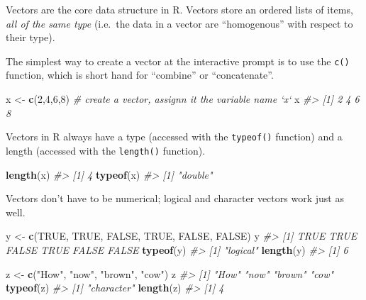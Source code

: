 \documentclass[]{book}
\newenvironment{Shaded}{\begin{snugshade}}{\end{snugshade}}
\newcommand{\CommentTok}[1]{\textcolor[rgb]{0.56,0.35,0.01}{\textit{#1}}}
\newcommand{\DecValTok}[1]{\textcolor[rgb]{0.00,0.00,0.81}{#1}}
\newcommand{\KeywordTok}[1]{\textcolor[rgb]{0.13,0.29,0.53}{\textbf{#1}}}
\newcommand{\NormalTok}[1]{#1}
\newcommand{\OtherTok}[1]{\textcolor[rgb]{0.56,0.35,0.01}{#1}}
\newcommand{\StringTok}[1]{\textcolor[rgb]{0.31,0.60,0.02}{#1}}
\theoremstyle{definition}
\theoremstyle{definition}
\theoremstyle{definition}
\theoremstyle{remark}
\begin{document}
Vectors are the core data structure in R. Vectors store an ordered lists
of items, \emph{all of the same type} (i.e.~the data in a vector are
``homogenous'' with respect to their type).

The simplest way to create a vector at the interactive prompt is to use
the \texttt{c()} function, which is short hand for ``combine'' or
``concatenate''.

\begin{Shaded}
\begin{Highlighting}[]
\NormalTok{x <-}\StringTok{ }\KeywordTok{c}\NormalTok{(}\DecValTok{2}\NormalTok{,}\DecValTok{4}\NormalTok{,}\DecValTok{6}\NormalTok{,}\DecValTok{8}\NormalTok{)  }\CommentTok{# create a vector, assignn it the variable name `x`}
\NormalTok{x}
\CommentTok{#> [1] 2 4 6 8}
\end{Highlighting}
\end{Shaded}

Vectors in R always have a type (accessed with the \texttt{typeof()}
function) and a length (accessed with the \texttt{length()} function).

\begin{Shaded}
\begin{Highlighting}[]
\KeywordTok{length}\NormalTok{(x)}
\CommentTok{#> [1] 4}
\KeywordTok{typeof}\NormalTok{(x)}
\CommentTok{#> [1] "double"}
\end{Highlighting}
\end{Shaded}

Vectors don't have to be numerical; logical and character vectors work
just as well.

\begin{Shaded}
\begin{Highlighting}[]
\NormalTok{y <-}\StringTok{ }\KeywordTok{c}\NormalTok{(}\OtherTok{TRUE}\NormalTok{, }\OtherTok{TRUE}\NormalTok{, }\OtherTok{FALSE}\NormalTok{, }\OtherTok{TRUE}\NormalTok{, }\OtherTok{FALSE}\NormalTok{, }\OtherTok{FALSE}\NormalTok{)}
\NormalTok{y}
\CommentTok{#> [1]  TRUE  TRUE FALSE  TRUE FALSE FALSE}
\KeywordTok{typeof}\NormalTok{(y)}
\CommentTok{#> [1] "logical"}
\KeywordTok{length}\NormalTok{(y)}
\CommentTok{#> [1] 6}

\NormalTok{z <-}\StringTok{ }\KeywordTok{c}\NormalTok{(}\StringTok{"How"}\NormalTok{, }\StringTok{"now"}\NormalTok{, }\StringTok{"brown"}\NormalTok{, }\StringTok{"cow"}\NormalTok{)}
\NormalTok{z}
\CommentTok{#> [1] "How"   "now"   "brown" "cow"}
\KeywordTok{typeof}\NormalTok{(z)}
\CommentTok{#> [1] "character"}
\KeywordTok{length}\NormalTok{(z)}
\CommentTok{#> [1] 4}
\end{Highlighting}
\end{Shaded}
\end{document}
